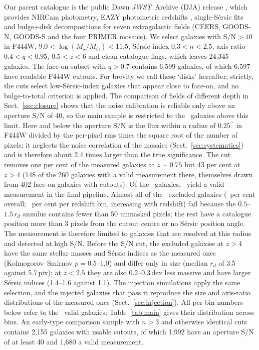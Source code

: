 \documentclass[fleqn,usenatbib]{mnras}
\newcommand{\JWST}{\textit{JWST}}
\newcommand{\Mstar}{M_\star}
\providecommand{\arcsec}{\ensuremath{^{\prime\prime}}}
\begin{document}
Our parent catalogue is the public Dawn \JWST\ Archive (DJA) release
\citep{Valentino2023}, which provides NIRCam photometry, EAZY photometric
redshifts \citep{Brammer2008}, single-S\'ersic fits \citep{Sersic1963} and
bulge+disk decompositions for seven extragalactic fields (CEERS, GOODS-N,
GOODS-S and the four PRIMER mosaics). We select galaxies with S/N$>10$ in
F444W, $9.0<\log(\Mstar/M_\odot)<11.5$, S\'ersic index $0.3<n<2.5$, axis ratio
$0.4<q<0.95$, $0.5<z<6$ and clean catalogue flags, which leaves 24{,}345
galaxies. The face-on subset with $q>0.7$ contains 6{,}599 galaxies, of
which 6{,}597 have readable F444W cutouts. For brevity we call these `disks'
hereafter; strictly, the cuts select low-S\'ersic-index galaxies that appear
close to face-on, and no bulge-to-total criterion is applied. The comparison of fields of different depth
in Sect.~\ref{sec:closure} shows that the noise calibration is reliable only
above an aperture S/N of 40, so the main sample is restricted to the \numNtotal\
galaxies above this limit. Here and below the aperture S/N is the flux within a
radius of $0.25\arcsec$ in F444W divided by the per-pixel rms times the square
root of the number of pixels; it neglects the noise correlation of the mosaics
(Sect.~\ref{sec:systematics}) and is therefore about 2.4 times larger than the
true significance. The cut removes one per cent of the measured galaxies at
$z\sim0.75$ but 43 per cent at $z>4$ (148 of the 260 galaxies with a valid measurement there, themselves drawn from 402 face-on galaxies with cutouts). Of the \numNtotal\
galaxies, \numNvalid\ yield a valid measurement in the final pipeline. Almost all
of the \numNexcl\ excluded galaxies (\numNexclPct\ per cent overall;
\numNexclRange\ per cent per redshift bin, increasing with redshift) fail because
the $0.5$--$1.5\,r_d$ annulus contains fewer than 50 unmasked pixels; the rest
have a catalogue position more than 3 pixels from the cutout centre or no
S\'ersic position angle. The measurement is therefore limited to galaxies that
are resolved at this radius and detected at high S/N. Before the S/N cut, the
excluded galaxies at $z>4$ have the same stellar masses and S\'ersic indices as
the measured ones (Kolmogorov--Smirnov $p=0.5$--1.0) and differ only in size
(median $r_d$ of 3.5 against 5.7\,pix); at $z<2.5$ they are also 0.2--0.3\,dex
less massive and have larger S\'ersic indices (1.4--1.6 against 1.1). The
injection simulations apply the same selection, and the injected galaxies that
pass it reproduce the size and axis-ratio distributions of the measured ones
(Sect.~\ref{sec:injection}). All per-bin numbers below refer to the \numNvalid\
valid galaxies; Table~\ref{tab:main} gives their distribution across bins. An
early-type comparison sample with $n>3$ and otherwise identical cuts contains
2{,}155 galaxies with usable cutouts, of which 1{,}992 have an aperture S/N of at
least 40 and 1{,}680 a valid measurement.
\end{document}
